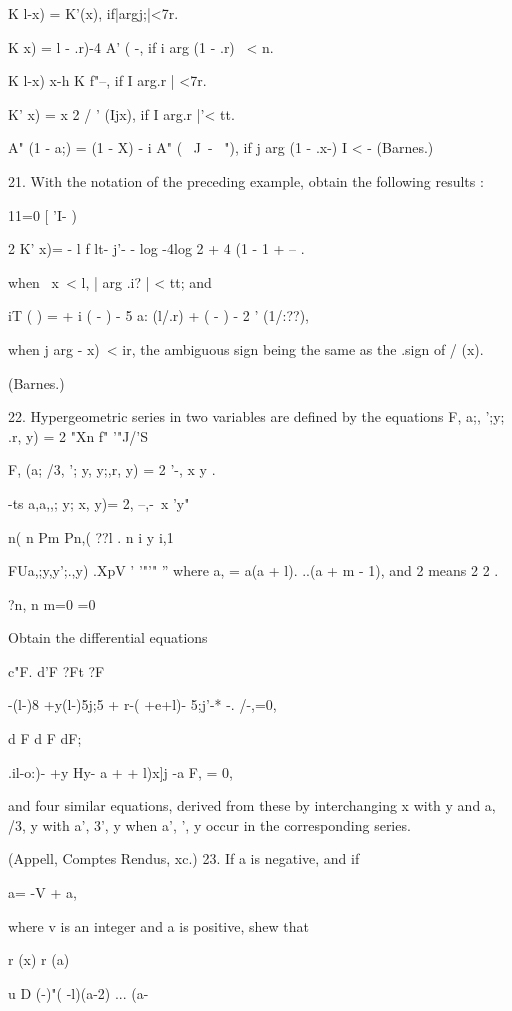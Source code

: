 K l-x) = K'(x), if|argj;|<7r.

K x) = l - .r)-4 A' ( -, if i arg (1 - .r) \ < n.

K l-x) x-h K f"--, if I arg.r | <7r.

K' x) = x 2 / ' (Ijx), if I arg.r |'< tt.

A" (1 - a;) = (1 - X) - i A" ( \ J\ - \ "), if j arg (1 - .x-) I < -
(Barnes.)

21. With the notation of the preceding example, obtain the following
results :

11=0 [ 'I- )

2 K' x)= - l f lt- j'- - log -4log 2 + 4 (1 - 1 + -- .

when \ x\ < l, | arg .i? | < tt; and

iT ( ) = + i ( - ) - 5 a: (l/.r) + ( - ) - 2 ' (1/:??),

when j arg - x)\ < ir, the ambiguous sign being the same as the .sign
of / (x).

(Barnes.)

%
%

22. Hypergeometric series in two variables are defined by the
equations F, a;, ';y; .r, y) = 2 "Xn f" '"J/'S

F, (a; /3, '; y, y;,r, y) = 2 '-, x y .

-ts a,a,,; y; x, y)= 2, --,-\ x 'y"

 n( n Pm Pn,( ??l . n i y i,1

FUa,;y,y';.,y) .XpV ' '"'" '' where a, = a(a + l). ..(a + m - 1), and
2 means 2 2 .

?n, n m=0 =0

Obtain the differential equations

c"F. d'F ?Ft ?F

-(l-)8 +y(l-)5j;5 + r-( +e+l)- 5;j'-* -. /-,=0,

d F d F dF;

.il-o:)- +y Hy- a + + l)x]j -a F, = 0,

and four similar equations, derived from these by interchanging x with
y and a, /3, y with a', 3', y when a', ', y occur in the corresponding
series.

(Appell, Comptes Rendus, xc.) 23. If a is negative, and if

a= -V + a,

where v is an integer and a is positive, shew that

r (x) r (a)

u D (-)"( -l)(a-2) ... (a-%

